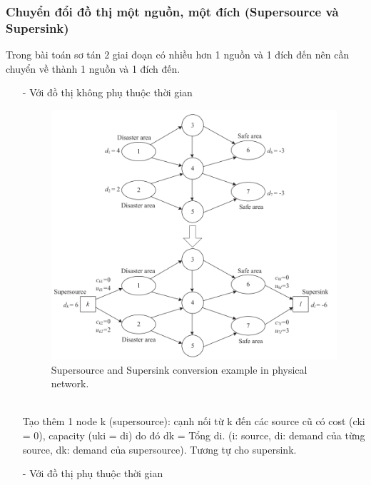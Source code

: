 \documentclass[a4paper]{article}
\begin{document}
\subsubsection{Chuyển đổi đồ thị một nguồn, một đích (Supersource và Supersink)}
{Trong bài toán sơ tán 2 giai đoạn có nhiều hơn 1 nguồn và 1 đích đến nên cần chuyển về thành 1 nguồn và 1 đích đến. }
\begin{enumerate}
    \item[-] {Với đồ thị không phụ thuộc thời gian}
    \begin{figure}[h]
        \centering
        \includegraphics[scale=0.6]{physical_network.png}
        \caption{Supersource and Supersink conversion example in physical network.}
        \label{fig:enter-label}
    \end{figure}
    \\
    {Tạo thêm 1 node k (supersource): cạnh nối từ k đến các source cũ có cost (cki = 0), capacity (uki = di) do đó dk = Tổng di. (i: source, di: demand của từng source, dk: demand của supersource). Tương tự cho supersink.}
    \item[-] {Với đồ thị phụ thuộc thời gian}
    \begin{figure}[h]
        \centering

\end{figure}
\end{enumerate}
\end{document}
